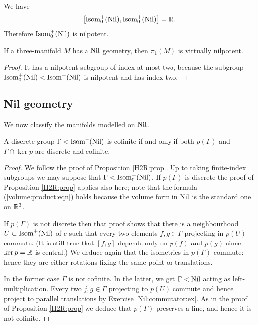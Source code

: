 \begin{ex} \label{isonil:nilpotente:ex}
We have 
$$\big[{\rm Isom}_0^+({\rm Nil}), {\rm Isom}_0^+({\rm Nil})\big] = \mathbb{R}.$$ 
Therefore ${\rm Isom}_0^+({\rm Nil})$ is nilpotent.
\end{ex}

\begin{cor} \label{Nil:is:Nil:cor}
If a three-manifold $M$ has a ${\rm Nil}$ geometry, then $\pi_1(M)$ is virtually nilpotent.
\end{cor}
\begin{proof}
It has a nilpotent subgroup of index at most two, because
the subgroup ${\rm Isom}_0^+({\rm Nil})< {\rm Isom}^+({\rm Nil})$ is nilpotent and has index two.
\end{proof}

\subsection{Nil geometry}
We now classify the manifolds modelled on ${\rm Nil}$. 

\begin{prop} \label{Nil:cofinite:prop}
A discrete group $\Gamma < {\rm Isom}^+ ({\rm Nil})$ is cofinite if and only if both $p(\Gamma)$ and $\Gamma \cap \ker p$ are discrete and cofinite.
\end{prop}
\begin{proof}
We follow the proof of Proposition \ref{H2R:prop}. Up to taking finite-index subgroups we may suppose that $\Gamma<{\rm Isom}^+_0({\rm Nil})$.
If $p(\Gamma)$ is discrete the proof of Proposition \ref{H2R:prop} applies also here; note that the formula (\ref{volume:product:eqn}) holds because the volume form in ${\rm Nil}$ is the standard one on $\mathbb{R}^3$.

If $p(\Gamma)$ is not discrete then that proof shows that there is a neighbourhood $U\subset {\rm Isom}^+({\rm Nil})$ of $e$ such that every two elements $f,g\in\Gamma$ projecting in $p(U)$ commute. (It is still true that $[f,g]$ depends only on $p(f)$ and $p(g)$ since $\ker p = \mathbb{R}$ is central.) We deduce again that the isometries in $p(\Gamma)$ commute: hence they are either rotations fixing the same point or translations. 

In the former case $\Gamma$ is not cofinite. In the latter, we get $\Gamma < {\rm Nil}$ acting as left-multiplication. Every two $f,g \in \Gamma$ projecting to $p(U)$ commute and hence project to parallel translations by Exercise \ref{Nil:commutator:ex}. As in the proof of Proposition \ref{H2R:prop} we deduce that $p(\Gamma)$ preserves a line, and hence it is not cofinite.
\end{proof}


